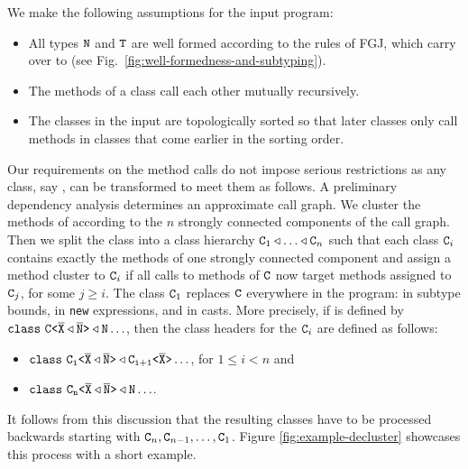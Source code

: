 We make the following assumptions for the input program:
\begin{itemize}
\item All types ${\tt N}$ and ${\tt T}$ are well formed according to the
  rules of FGJ, which carry over to \TFGJ (see Fig.~\ref{fig:well-formedness-and-subtyping}).
\item The methods of a class call each other mutually recursively.
\item The classes in the input are topologically sorted so that later
  classes only call methods in classes that come earlier in the
  sorting order.
\end{itemize}
Our requirements on the method calls do not impose serious
restrictions as any class, say , can be transformed to meet them as
follows. A preliminary dependency analysis determines an 
approximate call graph. We cluster the methods of  according to
the $n$ strongly
connected components of the call graph. Then we split the class into a
class hierarchy 
$\mv{C}_1 \extends \dots \extends \mv{C}_n$ such that each class ${\tt C}_i$ contains
exactly the methods of one strongly connected component and assign a
method cluster to ${\tt C}_i$ if all calls to methods of  ${\tt C}$ now
target methods assigned to ${\tt C}_j$, for some $j\ge i$. The class
${\tt C}_1$ replaces ${\tt C}$ everywhere in the program: in subtype
bounds, in \texttt{new} expressions, and in casts. More precisely, if
 is defined by $\mathtt{class\ \exptype{C}{\ol X \extends \ol N}
\extends N \dots} $, then the class headers for the ${\tt C}_i$ are
defined as follows:
\begin{itemize}
\item  $\mathtt{class\ \mathtt{C_i \texttt{<} \overline{\tt X} \triangleleft \overline{\tt N} \texttt{>} }
\triangleleft \mathtt{C_{i+1} \texttt{<} \overline{\tt X} \texttt{>} } \dots} $, for $1\le i < n$ and
\item  $\mathtt{class\ \mathtt{C_n \texttt{<} \overline{\tt X} \triangleleft \overline{\tt N} \texttt{>} }
\triangleleft N \dots} $.
\end{itemize}
It follows from this discussion that the resulting classes have to be
processed backwards starting with ${\tt C}_n, {\tt C}_{n-1}, \dots, {\tt C}_1$.
Figure \ref{fig:example-decluster} showcases this process with a short example.

